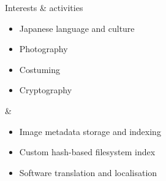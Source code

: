\documentclass[a4paper,10pt]{article}
\begin{document}
\begin{interestsblock}{Interests \& activities}


\begin{itemize}[topsep=-2mm,itemsep=1mm,parsep=1mm]

\item Japanese language and culture
\item Photography
\item Costuming
\item Cryptography

\end{itemize}
&

\begin{itemize}[topsep=-2mm,itemsep=1mm,parsep=1mm]

\item Image metadata storage and indexing
\item Custom hash-based filesystem index
\item Software translation and localisation

\end{itemize}


\end{interestsblock}
\end{document}
